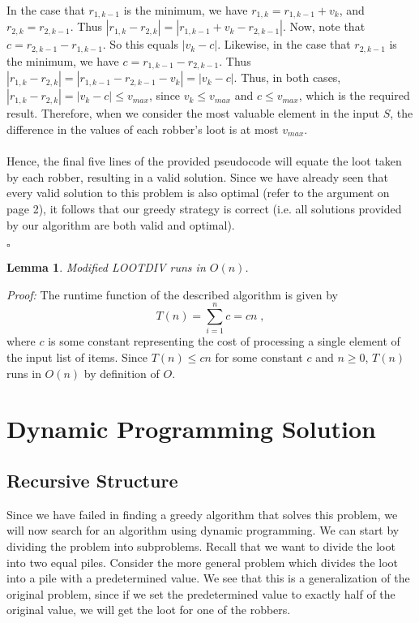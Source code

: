 \documentclass{article}
\newtheorem{lemma}[theorem]{Lemma}
\begin{document}
In the case that $r_{1,k-1}$ is the minimum, we have $r_{1,k} = r_{1,k-1} + v_k$, and $r_{2,k} = r_{2,k-1}$. Thus $|r_{1,k} - r_{2,k}| = |r_{1,k-1} + v_k - r_{2,k-1}|$.  Now, note that $c =r_{2,k-1} - r_{1,k-1}$.  So this equals $|v_k - c|$.  Likewise, in the case that $r_{2,k-1}$ is the minimum, we have $c = r_{1,k-1} - r_{2,k-1}$.  Thus $|r_{1,k} - r_{2,k}| = |r_{1,k-1} - r_{2,k-1} - v_k| = |v_k - c|$.  Thus, in both cases, $|r_{1, k} - r_{2, k}| = |v_{k} - c| \leq v_{max}$, since $v_{k} \leq v_{max}$ and $c \leq v_{max}$, which is the required result. Therefore, when we consider the most valuable element in the input $S$, the difference in the values of each robber's loot is at most $v_{max}$. \\ \\
Hence, the final five lines of the provided pseudocode will equate the loot taken by each robber, resulting in a valid solution. Since we have already seen that every valid solution to this problem is also optimal (refer to the argument on page 2), it follows that our greedy strategy is correct (i.e. all solutions provided by our algorithm are both valid and optimal).

\begin{flushright}
$\square$
\end{flushright}

\newpage

\begin{lemma}
Modified LOOTDIV runs in $O(n)$.
\end{lemma}

\textit{Proof:} The runtime function of the described algorithm is given by
\[
	T(n) = \sum_{i=1}^{n} c = cn \;,
\]
where $c$ is some constant representing the cost of processing a single element of the input list of items. Since $T(n) \leq cn$ for some constant $c$ and $n \geq 0$, $T(n)$ runs in $O(n)$ by definition of $O$.

\section{Dynamic Programming Solution}

\subsection{Recursive Structure}

Since we have failed in finding a greedy algorithm that solves this problem, we will now search for an algorithm using dynamic programming.  We can start by dividing the problem into subproblems.  Recall that we want to divide the loot into two equal piles.  Consider the more general problem which divides the loot into a pile with a predetermined value.  We see that this is a generalization of the original problem, since if we set the predetermined value to exactly half of the original value, we will get the loot for one of the robbers.
\end{document}
